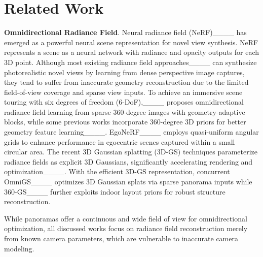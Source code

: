 \section{Related Work}
\textbf{Omnidirectional Radiance Field}.
Neural radiance field (NeRF)____ has emerged as a powerful neural scene representation for novel view synthesis. NeRF represents a scene as a neural network with radiance and opacity outputs for each 3D point. Although most existing radiance field approaches____ can synthesize photorealistic novel views by learning from dense perspective image captures, they tend to suffer from inaccurate geometry reconstruction due to the limited field-of-view coverage and sparse view inputs. 
To achieve an immersive scene touring with six degrees of freedom (6-DoF),____ proposes omnidirectional radiance field learning from sparse 360-degree images with geometry-adaptive blocks, while some previous works incorporate 360-degree 3D priors for better geometry feature learning____. EgoNeRF____ employs quasi-uniform angular grids to enhance performance in egocentric scenes captured within a small circular area.
The recent 3D Gaussian splatting (3D-GS) techniques parameterize radiance fields as explicit 3D Gaussians, significantly accelerating rendering and optimization____. 
With the efficient 3D-GS representation, concurrent OmniGS____ optimizes 3D Gaussian splats via sparse panorama inputs while 360-GS____ further exploits indoor layout priors for robust structure reconstruction. 

While panoramas offer a continuous and wide field of view for omnidirectional optimization, all discussed works focus on radiance field reconstruction merely from known camera parameters, which are vulnerable to inaccurate camera modeling.

